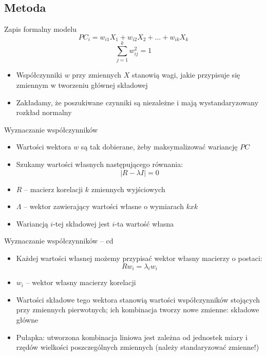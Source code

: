 \documentclass{beamer}
\begin{document}
\subsection{Metoda}
\begin{frame}{Zapis formalny modelu}
  $$PC_i = w_{i1}X_1 + w_{i2}X_2 + \dots + w_{ik}X_k $$
  $$\sum_{j=1}^{k}w_{ij}^{2} = 1 $$
  \begin{itemize}
  \item Współczynniki $w$ przy zmiennych $X$ stanowią wagi, jakie przypisuje się zmiennym w tworzeniu głównej składowej
  \item Zakładamy, że poszukiwane czynniki są niezależne i mają wystandaryzowany rozkład normalny
  \end{itemize}
\end{frame}

\begin{frame}{Wyznaczanie współczynników}
  \begin{itemize}
  \item Wartości wektora $w$ są tak dobierane, żeby maksymalizować wariancję $PC$
  \item Szukamy wartości własnych następującego równania:
    $$ |R - \lambda I| = 0$$
  \item $R$ -- macierz korelacji $k$ zmiennych wyjściowych
  \item $\Lambda$ -- wektor zawierający wartości własne o wymiarach $kxk$
  \item Wariancją $i$-tej składowej jest $i$-ta wartość własna
  \end{itemize}
\end{frame}

\begin{frame}{Wyznaczanie współczynników -- cd}
  \begin{itemize}
  \item Każdej wartości własnej możemy przypisać wektor własny macierzy o postaci:
    $$Rw_i = \lambda_iw_i $$
  \item $w_i$ -- wektor własny macierzy korelacji
  \item Wartości składowe tego wektora stanowią wartości współczynników stojących przy zmiennych pierwotnych; ich kombinacja tworzy nowe zmienne: składowe główne
   \item Pułapka: utworzona kombinacja liniowa jest zależna od jednostek miary i rzędów wielkości poszczególnych zmiennych (należy standaryzować zmienne!)
  \end{itemize}
\end{frame}
\end{document}
